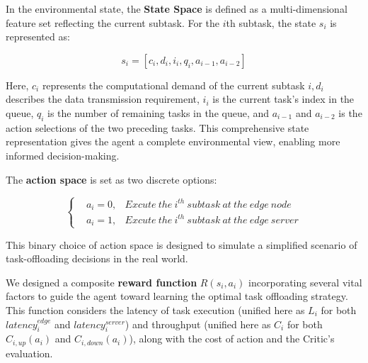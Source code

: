 \documentclass[preprint,12pt,authoryear]{elsarticle}
\begin{document}
In the environmental state, the \textbf{State Space} is defined as a multi-dimensional feature set reflecting the current subtask. For the \(i\)th subtask, the state \(s_i\) is represented as:

\begin{equation}
    s_i=[c_i,d_i,i_i,q_i,a_{i-1},a_{i-2} ]
\end{equation}

Here, \(c_i\) represents the computational demand of the current subtask \(i,d_i\) describes the data transmission requirement, \(i_i\) is the current task's index in the queue, \(q_i\) is the number of remaining tasks in the queue, and \(a_{i-1}\) and \(a_{i-2}\) is the action selections of the two preceding tasks. This comprehensive state representation gives the agent a complete environmental view, enabling more informed decision-making.

The \textbf{action space} is set as two discrete options:

\begin{equation}
    \label{eq:17}
    \left\{
        \begin{aligned}
            &a_i=0, &Excute\ the \ i^{th}\ subtask \ at \ the\ edge\ node\\
            &a_i=1, &Excute\ the \ i^{th}\ subtask \ at \ the\ edge\ server
        \end{aligned}
    \right.
\end{equation}

This binary choice of action space is designed to simulate a simplified scenario of task-offloading decisions in the real world.

We designed a composite \textbf{reward function} \(R(s_i,a_i)\) incorporating several vital factors to guide the agent toward learning the optimal task offloading strategy. This function considers the latency of task execution (unified here as \(L_i\) for both \(latency_i^{edge}\) and \(latency_i^{server}\))  and throughput (unified here as \(C_i\) for both \(C_{i, up} (a_i)\) and \(C_{i, down} (a_i)\)), along with the cost of action and the Critic's evaluation.
\end{document}
